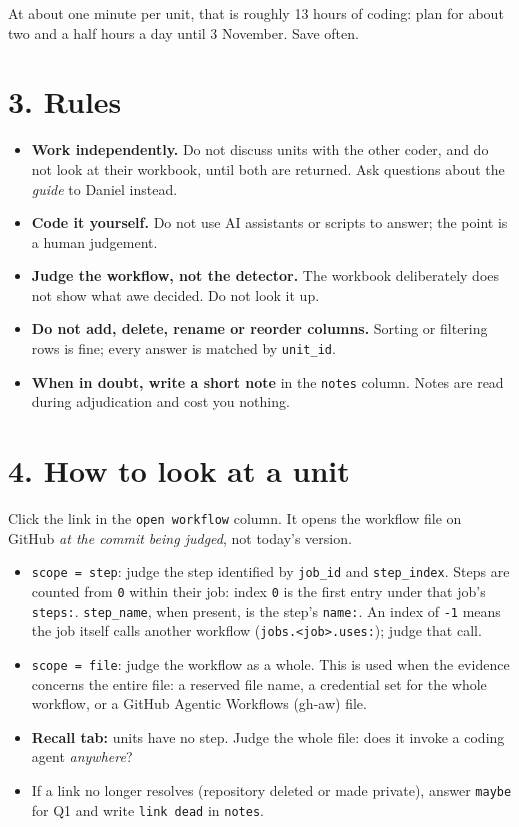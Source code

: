\documentclass[10pt,a4paper]{article}
\newcommand{\val}[1]{\texttt{#1}}
\begin{document}
At about one minute per unit, that is roughly 13 hours of coding: plan for about
two and a half hours a day until 3 November. Save often.

\section*{3. Rules}

\begin{itemize}
\item \textbf{Work independently.} Do not discuss units with the other coder,
and do not look at their workbook, until both are returned. Ask questions about
the \emph{guide} to Daniel instead.
\item \textbf{Code it yourself.} Do not use AI assistants or scripts to answer;
the point is a human judgement.
\item \textbf{Judge the workflow, not the detector.} The workbook deliberately
does not show what \textsf{awe} decided. Do not look it up.
\item \textbf{Do not add, delete, rename or reorder columns.} Sorting or
filtering rows is fine; every answer is matched by \val{unit\_id}.
\item \textbf{When in doubt, write a short note} in the \val{notes} column. Notes
are read during adjudication and cost you nothing.
\end{itemize}

\section*{4. How to look at a unit}

Click the link in the \val{open workflow} column. It opens the workflow file on
GitHub \emph{at the commit being judged}, not today's version.

\begin{itemize}
\item \val{scope = step}: judge the step identified by \val{job\_id} and
\val{step\_index}. Steps are counted from \val{0} within their job: index
\val{0} is the first entry under that job's \val{steps:}. \val{step\_name}, when
present, is the step's \val{name:}. An index of \val{-1} means the job itself
calls another workflow (\val{jobs.<job>.uses:}); judge that call.
\item \val{scope = file}: judge the workflow as a whole. This is used when the
evidence concerns the entire file: a reserved file name, a credential set for
the whole workflow, or a GitHub Agentic Workflows (gh-aw) file.
\item \textbf{Recall tab:} units have no step. Judge the whole file: does it
invoke a coding agent \emph{anywhere}?
\item If a link no longer resolves (repository deleted or made private), answer
\val{maybe} for Q1 and write \val{link dead} in \val{notes}.
\end{itemize}
\end{document}
